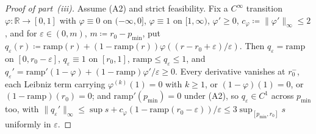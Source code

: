 \documentclass[acmsmall,nonacm,screen]{acmart}
\theoremstyle{acmplain}%
\theoremstyle{acmdefinition}%
\newcommand{\R}{\mathbb{R}}
\numberwithin{equation}{section}
\begin{document}
\begin{appendix}
\begin{proof}[Proof of part~(iii)]
Assume (A2) and strict feasibility. Fix a $C^\infty$ transition $\varphi:\R\to[0,1]$ with $\varphi\equiv0$ on $(-\infty,0]$, $\varphi\equiv1$ on $[1,\infty)$, $\varphi'\geq0$, $c_\varphi\coloneqq\|\varphi'\|_\infty\leq2$, and for $\varepsilon\in(0,m)$, $m\coloneqq r_0-p_{\min}$, put $q_\varepsilon(r)\coloneqq\mathrm{ramp}(r)+(1-\mathrm{ramp}(r))\varphi((r-r_0+\varepsilon)/\varepsilon)$. Then $q_\varepsilon=\mathrm{ramp}$ on $[0,r_0-\varepsilon]$, $q_\varepsilon\equiv1$ on $[r_0,1]$, $\mathrm{ramp}\leq q_\varepsilon\leq1$, and $q_\varepsilon'=\mathrm{ramp}'(1-\varphi)+(1-\mathrm{ramp})\varphi'/\varepsilon\geq0$. Every derivative vanishes at $r_0^-$, each Leibniz term carrying $\varphi^{(k)}(1)=0$ with $k\geq1$, or $(1-\varphi)(1)=0$, or $(1-\mathrm{ramp})(r_0)=0$; and $\mathrm{ramp}'(p_{\min})=0$ under (A2), so $q_\varepsilon\in C^1$ across $p_{\min}$ too, with $\|q_\varepsilon'\|_\infty\leq\sup s+c_\varphi(1-\mathrm{ramp}(r_0-\varepsilon))/\varepsilon\leq3\sup_{[p_{\min},r_0]}s$ uniformly in $\varepsilon$.


\end{proof}
\end{appendix}
\end{document}
